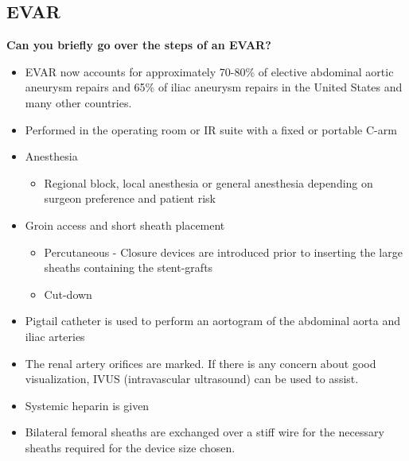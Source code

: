 \documentclass[
]{book}
\providecommand{\tightlist}{%
  \setlength{\itemsep}{0pt}\setlength{\parskip}{0pt}}
\begin{document}
\hypertarget{evar}{%
\subsection{EVAR}\label{evar}}

\textbf{Can you briefly go over the steps of an EVAR?}
\citep{mooreVascularEndovascularSurgery2019}

\begin{itemize}
\item
  EVAR now accounts for approximately 70-80\% of elective abdominal
  aortic aneurysm repairs and 65\% of iliac aneurysm repairs in the
  United States and many other countries.
\item
  Performed in the operating room or IR suite with a fixed or portable
  C-arm
\item
  Anesthesia

  \begin{itemize}
  \tightlist
  \item
    Regional block, local anesthesia or general anesthesia depending
    on surgeon preference and patient risk
  \end{itemize}
\item
  Groin access and short sheath placement

  \begin{itemize}
  \item
    Percutaneous - Closure devices are introduced prior to inserting
    the large sheaths containing the stent-grafts
  \item
    Cut-down
  \end{itemize}
\item
  Pigtail catheter is used to perform an aortogram of the abdominal
  aorta and iliac arteries
\item
  The renal artery orifices are marked. If there is any concern about
  good visualization, IVUS (intravascular ultrasound) can be used to
  assist.
\item
  Systemic heparin is given
\item
  Bilateral femoral sheaths are exchanged over a stiff wire for the
  necessary sheaths required for the device size chosen.


\end{itemize}
\end{document}
